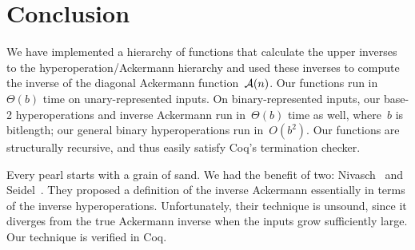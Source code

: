 
\section{Conclusion}
We have implemented a hierarchy of functions that calculate the upper inverses
to the hyperoperation/Ackermann hierarchy and used these inverses
to compute the inverse of the diagonal Ackermann function~$\mathcal{A}(n)$.
Our functions run in~$\Theta(b)$ time on unary-represented inputs.  On
binary-represented inputs, our \mbox{base-2} hyperoperations and inverse Ackermann
run in~$\Theta(b)$ time as well, where~$b$ is bitlength; our general binary 
hyperoperations run in~$O(b^2)$.
Our functions are structurally recursive,
and thus easily satisfy Coq's termination checker.

Every pearl starts with a grain of sand.  We had the benefit of two:
Nivasch~\cite{nivasch} and Seidel~\cite{seidel}.
They proposed a definition of the inverse Ackermann essentially in terms of
the inverse hyperoperations.  Unfortunately, their technique is unsound, since it diverges from
the true Ackermann inverse when the inputs grow sufficiently large.  Our technique is verified in Coq.








